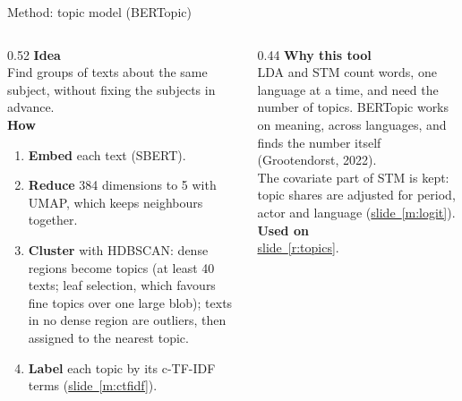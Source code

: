 \documentclass[aspectratio=169,10pt]{beamer}
\newcommand{\usedon}[1]{\hyperref[#1]{\textcolor{c4}{slide~\ref*{#1}}}}
\newcommand{\mhead}[1]{\textcolor{c1}{\textbf{#1}}\\[1pt]}
\begin{document}
\begin{frame}{Method: topic model (BERTopic)}
\begin{columns}[T]
\begin{column}{0.52\textwidth}\footnotesize
\mhead{Idea}
Find groups of texts about the same subject, without fixing the subjects in advance.\\[4pt]
\mhead{How}
\begin{enumerate}\setlength\itemsep{1pt}
\item \textbf{Embed} each text (SBERT).
\item \textbf{Reduce} 384 dimensions to 5 with \alert{UMAP}, which keeps neighbours together.
\item \textbf{Cluster} with \alert{HDBSCAN}: dense regions become topics (at least 40 texts; leaf selection, which favours fine topics over one large blob); texts in no dense region are outliers, then assigned to the nearest topic.
\item \textbf{Label} each topic by its c-TF-IDF terms (\usedon{m:ctfidf}).
\end{enumerate}
\end{column}
\begin{column}{0.44\textwidth}\footnotesize
\mhead{Why this tool}
LDA and STM count words, one language at a time, and need the number of topics. BERTopic works on meaning, across languages, and finds the number itself (Grootendorst, 2022).\\[3pt]
The covariate part of STM is kept: topic shares are adjusted for period, actor and language (\usedon{m:logit}).\\[6pt]
\mhead{Used on}
\usedon{r:topics}.
\end{column}
\end{columns}
\end{frame}
\end{document}
